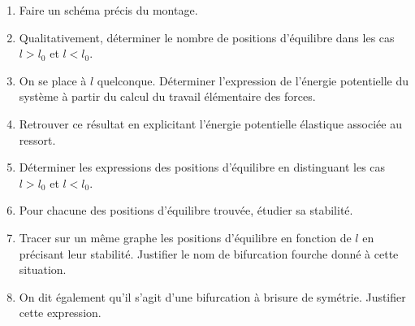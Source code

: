 \begin{enumerate}
	\item Faire un schéma précis du montage.
	\item Qualitativement, déterminer le nombre de positions d'équilibre dans les cas $l > l_0$ et $l < l_0$.
	\item On se place à $l$ quelconque. Déterminer l'expression de l'énergie potentielle du système à partir du calcul du travail élémentaire des forces.
	\item Retrouver ce résultat en explicitant l'énergie potentielle élastique associée au ressort.
	\item Déterminer les expressions des positions d'équilibre en distinguant les cas $l>l_0$ et $l<l_0$.
	\item Pour chacune des positions d'équilibre trouvée, étudier sa stabilité.
	\item Tracer sur un même graphe les positions d'équilibre en fonction de $l$ en précisant leur stabilité. Justifier le nom de bifurcation fourche donné à cette situation.
	\item On dit également qu'il s'agit d'une bifurcation à brisure de symétrie. Justifier cette expression. 
\end{enumerate}